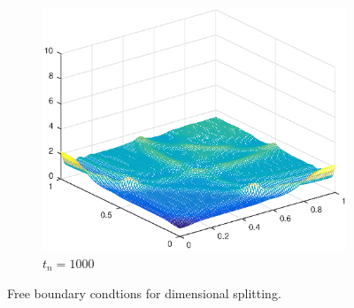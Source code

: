 \begin{figure}[h!]
\begin{subfigure}[t]{0.48\textwidth}
        \includegraphics[width=\textwidth]{images/sol_ri_1000.eps}
        \caption{$t_{n}=1000$}
        \label{fig:100}
    \end{subfigure}
    \caption{Free boundary condtions for dimensional splitting.}
    \label{fig:2DSolutions_ri}
\end{figure}




